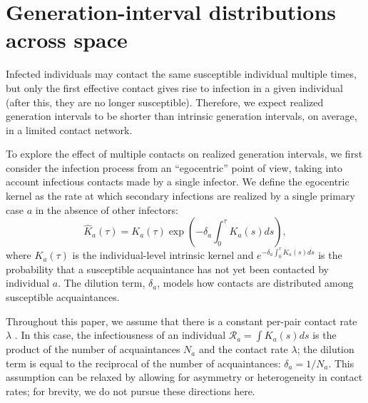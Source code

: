\documentclass[12pt]{article}
\newcommand{\RR}{\ensuremath{{\mathcal R}}}
\begin{document}

\section{Generation-interval distributions across space}

Infected individuals may contact the same susceptible individual multiple times, but only the first effective contact gives rise to infection in a given individual (after this, they are no longer susceptible).
Therefore, we expect realized generation intervals to be shorter than intrinsic generation intervals, on average, in a limited contact network.

To explore the effect of multiple contacts on realized generation intervals, we first consider the infection process from an ``egocentric'' point of view, taking into account infectious contacts made by a single infector.
We define the egocentric kernel as the rate at which secondary infections are realized by a single primary case $a$ in the absence of other infectors:
\begin{equation}
\hat{K}_a(\tau) = K_a(\tau) \exp \left(- \delta_a \int_0^\tau K_a(s) ds\right),
\end{equation}
where $K_a(\tau)$ is the individual-level intrinsic kernel and $e^{- \delta_a \int_0^\tau K_a(s) ds}$ is the probability that a susceptible acquaintance has not yet been contacted by individual $a$.
The dilution term, $\delta_a$, models how contacts are distributed among susceptible acquaintances.

Throughout this paper, we assume that there is a constant per-pair contact rate $\lambda$ \citep{trapman2016inferring}.
In this case, the infectiousness of an individual $\RR_a = \int K_a(s) ds$ is the product of the number of acquaintances $N_a$ and the contact rate $\lambda$; the dilution term is equal to the reciprocal of the number of acquaintances: $\delta_a = 1/N_a$.
This assumption can be relaxed by allowing for asymmetry \citep{trapman2016inferring} or heterogeneity \citep{ball1997epidemics, ball2002general} in contact rates; 
for brevity, we do not pursue these directions here.
\end{document}
